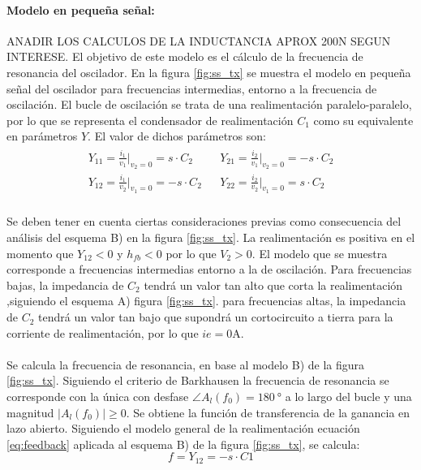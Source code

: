 \paragraph{Modelo en pequeña señal:} ANADIR LOS CALCULOS DE LA INDUCTANCIA APROX 200N SEGUN INTERESE. El objetivo de este modelo es el cálculo de la frecuencia de resonancia del oscilador. En la figura \ref{fig:ss_tx} se muestra el modelo en pequeña señal del oscilador para frecuencias intermedias, entorno a la frecuencia de oscilaci\'on. El bucle de oscilaci\'on se trata de una realimentación paralelo-paralelo, por lo que se representa el condensador de realimentación $C_1$ como su equivalente en par\'ametros $Y$. El valor de dichos par\'ametros son:
\[
\begin{array}{rl} 
      \begin{array}{l}
	 Y_{11} = \frac{i_1}{v_1}|_{v_2 = 0} = s \cdot C_2 \\
	 Y_{12} = \frac{i_1}{v_2}|_{v_1 = 0} = -s \cdot C_2 
      \end{array}
      &
      \begin{array}{l}
	 Y_{21} = \frac{i_2}{v_1}|_{v_2 = 0} = -s \cdot C_2 \\
	 Y_{22} = \frac{i_2}{v_2}|_{v_1 = 0} = s \cdot C_2 
      \end{array}
\end{array}
\]
\paragraph{}
Se deben tener en cuenta ciertas consideraciones previas como consecuencia del an\'alisis del esquema B) en la figura \ref{fig:ss_tx}. La realimentaci\'on es positiva en el momento que $Y_{12}<0$ y $h_{fb}<0$ por lo que $V_2>0$. El modelo que se muestra corresponde a frecuencias intermedias entorno a la de oscilaci\'on. Para frecuencias bajas, la impedancia de $C_2$ tendrá un valor tan alto que corta la realimentación ,siguiendo el esquema A) figura \ref{fig:ss_tx}. para frecuencias altas, la impedancia de $C_2$ tendr\'a un valor tan bajo que supondr\'a un cortocircuito a tierra para la corriente de realimentaci\'on, por lo que $ie = 0 \unit{\ampere}$.
\paragraph{}
Se calcula la frecuencia de resonancia, en base al modelo B) de la figura \ref{fig:ss_tx}. Siguiendo el criterio de Barkhausen la frecuencia de resonancia se corresponde con la única con desfase $\angle A_l(f_0) = \SI{180}{\degree}$ a lo largo del bucle y una magnitud $|A_l(f_0)|\ge 0$. Se obtiene la funci\'on de transferencia de la ganancia en lazo abierto.
Siguiendo el modelo general de la realimentaci\'on ecuaci\'on \ref{eq:feedback} aplicada al esquema B) de la figura \ref{fig:ss_tx}, se calcula: 
\begin{equation}
f = Y_{12} = -s \cdot C1 
\end{equation}
